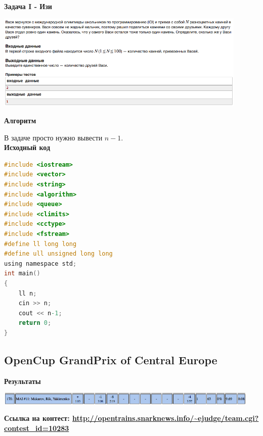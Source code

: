 \documentclass[a4paper,12pt]{article}
\begin{document}
\newpage
\textbf{{\large Задача I - Изи}}

\begin{center}
\includegraphics[width=0.9\textwidth]{CT_school_nn/CT_school_nn_I.png}\\ [1cm]
\end{center}

\textbf{{\large Алгоритм}}

В задаче просто нужно вывести $n - 1$. \\

\textbf{{\large Исходный код}} \\
\begin{lstlisting}[language=C]
#include <iostream>
#include <vector>
#include <string>
#include <algorithm>
#include <queue>
#include <climits>
#include <cctype>
#include <fstream>
#define ll long long
#define ull unsigned long long
using namespace std;
int main()
{
    ll n;
    cin >> n;
    cout << n-1;
    return 0;
}
\end{lstlisting}



%
%
\newpage
\subsection{OpenCup GrandPrix of Central Europe}

\textbf{{\large Результаты}} \\
\begin{center}
\includegraphics[width=0.95\textwidth]{OC_Central_Europe/OC_Central_Europe_result.png}\\ [1cm]
\end{center}

\textbf{{\large Ссылка на контест: \url{http://opentrains.snarknews.info/~ejudge/team.cgi?contest_id=10283}}}
\end{document}
